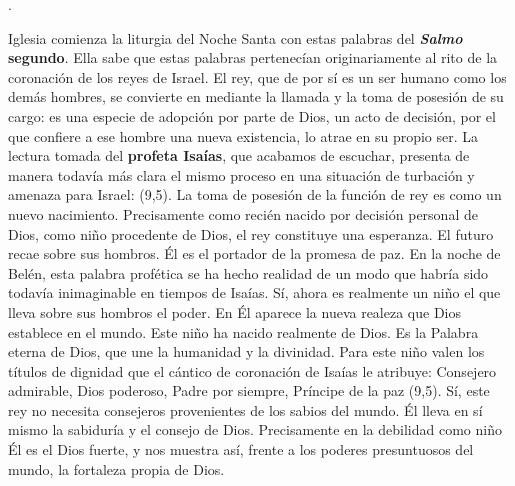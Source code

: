 \begin{body}
	. 
	
	 Iglesia comienza la liturgia del Noche Santa con estas palabras del \textbf{\emph{Salmo} segundo}. Ella sabe que estas palabras pertenecían originariamente al rito de la coronación de los reyes de Israel. El rey, que de por sí es un ser humano como los demás hombres, se convierte en  mediante la llamada y la toma de posesión de su cargo: es una especie de adopción por parte de Dios, un acto de decisión, por el que confiere a ese hombre una nueva existencia, lo atrae en su propio ser. La lectura tomada del \textbf{profeta Isaías}, que acabamos de escuchar, presenta de manera todavía más clara el mismo proceso en una situación de turbación y amenaza para Israel:  (9,5). La toma de posesión de la función de rey es como un nuevo nacimiento. Precisamente como recién nacido por decisión personal de Dios, como niño procedente de Dios, el rey constituye una esperanza. El futuro recae sobre sus hombros. Él es el portador de la promesa de paz. En la noche de Belén, esta palabra profética se ha hecho realidad de un modo que habría sido todavía inimaginable en tiempos de Isaías. Sí, ahora es realmente un niño el que lleva sobre sus hombros el poder. En Él aparece la nueva realeza que Dios establece en el mundo. Este niño ha nacido realmente de Dios. Es la Palabra eterna de Dios, que une la humanidad y la divinidad. Para este niño valen los títulos de dignidad que el cántico de coronación de Isaías le atribuye: Consejero admirable, Dios poderoso, Padre por siempre, Príncipe de la paz (9,5). Sí, este rey no necesita consejeros provenientes de los sabios del mundo. Él lleva en sí mismo la sabiduría y el consejo de Dios. Precisamente en la debilidad como niño Él es el Dios fuerte, y nos muestra así, frente a los poderes presuntuosos del mundo, la fortaleza propia de Dios.
	

\end{body}
